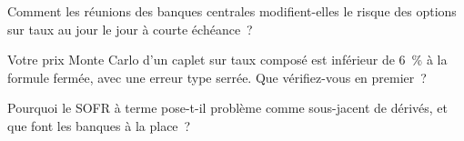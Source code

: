 \begin{interviewq}\label{iq:rc:modelling-overnight-rate-products:4}
Comment les réunions des banques centrales modifient-elles le risque des options sur taux au jour le jour à courte échéance~?
\end{interviewq}

\begin{interviewq}\label{iq:rc:modelling-overnight-rate-products:5}
Votre prix Monte Carlo d'un caplet sur taux composé est inférieur de 6~\% à la
formule fermée, avec une erreur type serrée. Que vérifiez-vous en premier~?
\end{interviewq}

\begin{interviewq}\label{iq:rc:modelling-overnight-rate-products:6}
Pourquoi le SOFR à terme pose-t-il problème comme sous-jacent de dérivés, et que font les banques à la place~?
\end{interviewq}

